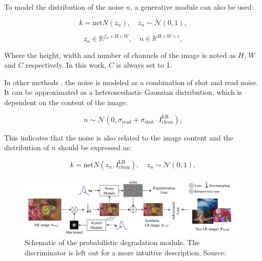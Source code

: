     
    To model the distribution of the noise $n$, a  generative module can also be used:

    \begin{equation}
        k = \text{net}N(z_n), \quad z_n \sim \mathcal{N}(0,1),
    \end{equation}

    \begin{equation}
        z_n \in \mathbb{R}^{f_n \times H \times W}, \quad n \in \mathbb{R}^{H \times W \times c},
    \end{equation}

    Where the height, width and number of channels of the image is noted as $H$, $W$ and $C$ respectively. 
    In this work, $C$ is always set to 1.

    In other methods \cite{plotz2017benchmarking}, the noise is modeled as a combination of shot and read noise. 
    It can be approximated as a heteroscedastic Gaussian distribution, which is dependent on the content of the image:

    \begin{equation}
        n \sim \mathcal{N}(0, \sigma_{\text{read}} + \sigma_{\text{shot}} \cdot I^{\text{LR}}_{\text{clean}}),
    \end{equation}

    This indicates that the noise is also related to the image content and the distribution of $n$ should be expressed as:


    \begin{equation}
        k = \text{net}N(z_n,I^{\text{LR}}_{\text{clean}}), \quad z_n \sim \mathcal{N}(0,1),
    \end{equation}

    \begin{figure}[h!]
        \centering
        \includegraphics[width=\textwidth]{Includes/3-probabilistic-degradation-model.png}
        \caption{Schematic of the probabilistic degradation module.
                The discriminator is left out for a more intuitive description. Source: \cite{luo2022learning}}
        \label{fig:3-probabilistic-degradation-model}
    \end{figure}

